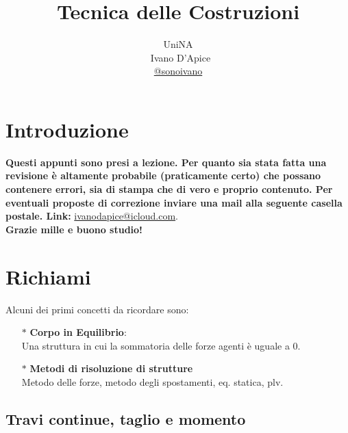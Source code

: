 \documentclass[a4paper,12pt, oneside]{book}
\title{Tecnica delle Costruzioni}
\author{UniNA\\\ Ivano D'Apice\\\href{https://t.me/sonoivano}{@sonoivano}}
\date{}
\begin{document}
	\maketitle
	
	\newtheorem{teorema}{Teorema}
	\newtheorem{definizione}{Definizione}
	\newtheorem{principio}{Principio}
	\newtheorem{esempio}{Esempio}
	\newtheorem{corollario}{Corollario}
	\newtheorem{lemma}{Lemma}
	\newtheorem{osservazione}{Osservazione}
	\newtheorem{nota}{Nota}
	\newtheorem{algoritmo}{Algoritmo}
	\tableofcontents
	\renewcommand{\chaptermark}[1]{%
		\markboth{\chaptername
			\ \thechapter.\ #1}{}}
	\renewcommand{\sectionmark}[1]{\markright{\thesection.\ #1}}
	
	\chapter{Introduzione}
	
	\textbf{Questi appunti sono presi a lezione. Per quanto sia stata fatta una revisione è altamente probabile (praticamente certo) che possano contenere errori, sia di stampa che di vero e proprio contenuto. Per eventuali proposte di correzione inviare una mail alla seguente casella postale. Link: } \url{ivanodapice@icloud.com}.\\
	\textbf{Grazie mille e buono studio!}
	
	\chapter{Richiami}
	
	Alcuni dei primi concetti da ricordare sono:
	
	\begin{itemize} 
		\item[$\ast$] \textbf{Corpo in Equilibrio}:\\
		Una struttura in cui la sommatoria delle forze agenti è uguale a 0.
		\item[$\ast$] \textbf{Metodi di risoluzione di strutture}\\
		Metodo delle forze, metodo degli spostamenti, eq. statica, plv.
	\end{itemize}
	
	\section{Travi continue, taglio e momento}
	
\end{document}
